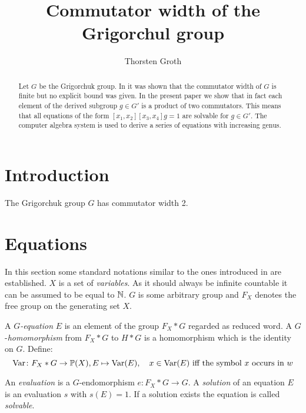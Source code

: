 \documentclass[a4paper,12pt]{article}
\title{Commutator width of the Grigorchul group}
\author{Thorsten Groth}
\begin{document}
\maketitle
%

\begin{abstract}
Let $G$ be the Grigorchuk group. In \cite{Lysenok:QudraticEquationsInGrig} it was shown that the commutator width of $G$ is finite but no explicit bound was given.
In the present paper we show that in fact each element of the derived subgroup $g\in G'$ is a product of two commutators. This means that all equations
of the form $[x_1,x_2][x_3,x_4]g=1$ are solvable for $g\in G'$. The computer algebra system \cite{GAP4} is used to derive a series of equations with increasing 
genus. 
\end{abstract}
\tableofcontents
\section{Introduction}
\begin{thm}
 The Grigorchuk group $G$ has commutator width 2.
\end{thm}

\section{Equations}
In this section some standard notations similar to the ones introduced in\cite{ComerfordEquationsFreeGroups} are established.
$X$ is a set of \emph{variables}. As it should always be infinite countable it can be assumed to be equal to $\mathbb{N}$. $G$ is some
arbitrary group and $F_X$ denotes the free group on the generating set $X$.

A $G$\emph{-equation} $E$ is an element of the group $F_X * G$ regarded as reduced word.
A $G$-\emph{homomorphism} from $F_X * G$ to $H*G$ is a homomorphism which is the identity on $G$.
Define:
\[\textup{Var} \colon F_X * G \to \mathbb{P}(X), E \mapsto \textup{Var}(E), \quad x\in \textup{Var}(E) \textup{ iff the symbol $x$ occurs in $w$}\]

An \emph{evaluation} is a $G$-endomorphism $e\colon F_X * G \to G$.
A \emph{solution} of an equation $E$ is an evaluation $s$ with $s(E)=1$. If a solution exists the equation is called \emph{solvable}.
\end{document}
